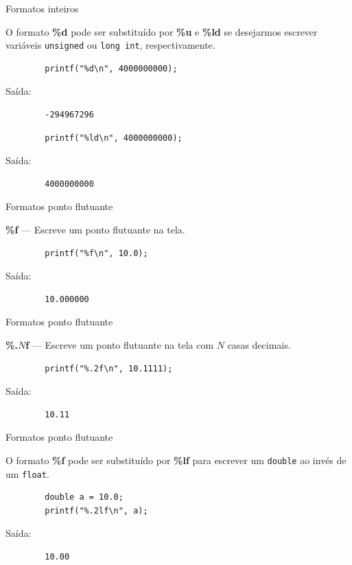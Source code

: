 \documentclass[handout]{beamer}
\newcommand{\cod}[1]{\texttt{#1}}
\begin{document}
\begin{frame}[fragile]{Formatos inteiros}

    O formato {\bf \%d} pode ser substituído por {\bf \%u} e {\bf \%ld} se desejarmos escrever variáveis \cod{unsigned} ou \cod{long int}, respectivamente.

    \begin{verbatim}
        printf("%d\n", 4000000000);
    \end{verbatim}
    Saída:
    \begin{verbatim}
        -294967296
    \end{verbatim}

    \pause
    \begin{verbatim}
        printf("%ld\n", 4000000000);
    \end{verbatim}
    Saída:
    \begin{verbatim}
        4000000000
    \end{verbatim}
\end{frame}

\begin{frame}[fragile]{Formatos ponto flutuante}

    \textbf{\%f} --- Escreve um ponto flutuante na tela.

    \begin{verbatim}
        printf("%f\n", 10.0);
    \end{verbatim}
    Saída:
    \begin{verbatim}
        10.000000
    \end{verbatim}

\end{frame}

\begin{frame}[fragile]{Formatos ponto flutuante}

    \textbf{\%.$N$f} --- Escreve um ponto flutuante na tela com $N$ casas decimais.

    \begin{verbatim}
        printf("%.2f\n", 10.1111);
    \end{verbatim}
    Saída:
    \begin{verbatim}
        10.11
    \end{verbatim}

\end{frame}

\begin{frame}[fragile]{Formatos ponto flutuante}

    O formato {\bf \%f} pode ser substituído por {\bf \%lf} para escrever um \cod{double} ao invés de um \cod{float}.

    \begin{verbatim}
        double a = 10.0;
        printf("%.2lf\n", a);
    \end{verbatim}
    Saída:
    \begin{verbatim}
        10.00
    \end{verbatim}

\end{frame}
\end{document}
